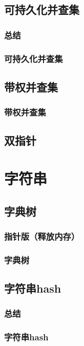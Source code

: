 \documentclass[10pt,a4paper]{article}
\begin{document}
	\subsection{可持久化并查集}
	\subsubsection{总结}
	
	\subsubsection{可持久化并查集}
	
	\subsection{带权并查集}
	\subsubsection{带权并查集}
	
	\subsection{双指针}
	
	\section{字符串}
	\subsection{字典树}
	\subsubsection{指针版（释放内存）}
	
	\subsubsection{字典树}
	
	\subsection{字符串hash}
	\subsubsection{总结}
	
	\subsubsection{字符串hash}
	
\end{document}
